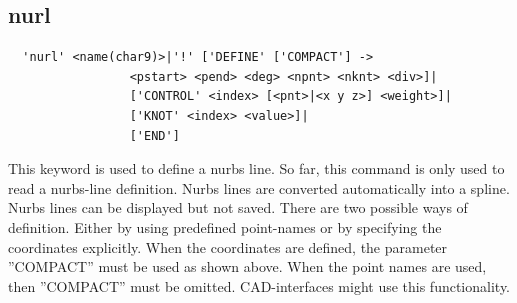 \documentclass{article}
\begin{document}
\subsection{\label{nurl}nurl}
\begin{verbatim}
  'nurl' <name(char9)>|'!' ['DEFINE' ['COMPACT'] ->
                 <pstart> <pend> <deg> <npnt> <nknt> <div>]|
                 ['CONTROL' <index> [<pnt>|<x y z>] <weight>]|
                 ['KNOT' <index> <value>]|
                 ['END']
\end{verbatim}
This keyword is used to define a nurbs line. So far, this command is only used to read a nurbs-line definition. Nurbs lines are converted automatically into a spline. Nurbs lines can be displayed but not saved. There are two possible ways of definition. Either by using predefined point-names or by specifying the coordinates explicitly. When the coordinates are defined, the parameter ''COMPACT'' must be used as shown above. When the point names are used, then ''COMPACT'' must be omitted. CAD-interfaces might use this functionality.
\end{document}

